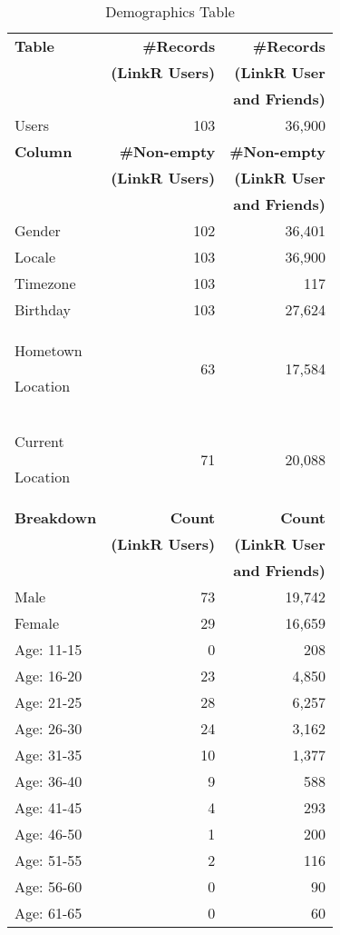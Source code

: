 \begin{table}[p]
\centering
\caption{\small Demographics Table}
\label{tab:demographics}
\begin{tabular}{|>{\small}p{2cm}|>{\small}r|>{\small}r|}
\hline
\textbf{Table} & \textbf{\#Records} & \textbf{\#Records} \\
& \textbf{(LinkR Users)} & \textbf{(LinkR User} \\
& & \textbf{and Friends)} \\
\hline
Users & 103 & 36,900 \\
\hline
\hline
\textbf{Column} & \textbf{\#Non-empty} & \textbf{\#Non-empty} \\
& \textbf{(LinkR Users)} & \textbf{(LinkR User} \\
& & \textbf{and Friends)} \\
\hline
Gender & 102 & 36,401 \\
\hline
Locale & 103 & 36,900 \\
\hline
Timezone & 103 & 117 \\
\hline
Birthday & 103 & 27,624 \\
\hline
Hometown\par Location & 63 & 17,584 \\
\hline
Current\par Location & 71 & 20,088 \\
\hline
\hline
\textbf{Breakdown} & \textbf{Count} & \textbf{Count} \\
& \textbf{(LinkR Users)} & \textbf{(LinkR User} \\
& & \textbf{and Friends)} \\
\hline
Male & 73 & 19,742 \\
\hline
Female & 29 & 16,659 \\
\hline
Age: 11-15 & 0 & 208 \\
\hline
Age: 16-20 & 23 & 4,850 \\
\hline
Age: 21-25 & 28 & 6,257 \\
\hline
Age: 26-30 & 24 & 3,162 \\
\hline
Age: 31-35 & 10 & 1,377 \\
\hline
Age: 36-40 & 9 & 588 \\
\hline
Age: 41-45 & 4 & 293 \\
\hline
Age: 46-50 & 1 & 200 \\
\hline
Age: 51-55 & 2 & 116 \\
\hline
Age: 56-60 & 0 & 90 \\
\hline
Age: 61-65 & 0 & 60 \\

\end{tabular}
\end{table}
